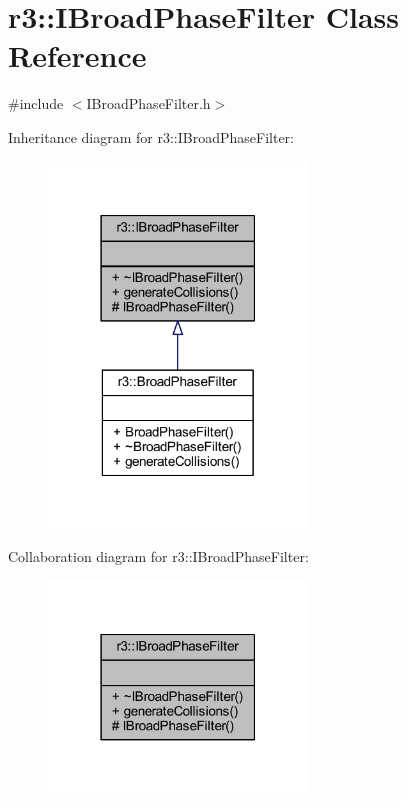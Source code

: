 \hypertarget{classr3_1_1_i_broad_phase_filter}{}\section{r3\+:\+:I\+Broad\+Phase\+Filter Class Reference}
\label{classr3_1_1_i_broad_phase_filter}


{\ttfamily \#include $<$I\+Broad\+Phase\+Filter.\+h$>$}



Inheritance diagram for r3\+:\+:I\+Broad\+Phase\+Filter\+:\nopagebreak
\begin{figure}[H]
\begin{center}
\leavevmode
\includegraphics[width=195pt]{classr3_1_1_i_broad_phase_filter__inherit__graph}
\end{center}
\end{figure}


Collaboration diagram for r3\+:\+:I\+Broad\+Phase\+Filter\+:\nopagebreak
\begin{figure}[H]
\begin{center}
\leavevmode
\includegraphics[width=195pt]{classr3_1_1_i_broad_phase_filter__coll__graph}
\end{center}
\end{figure}
